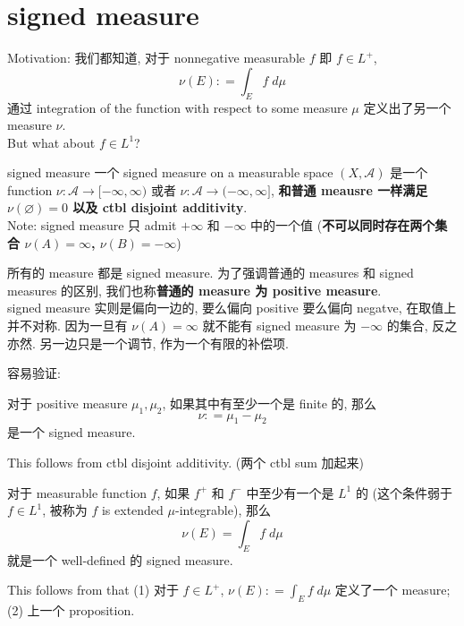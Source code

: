 \documentclass[lang=cn,11pt]{elegantbook}
\begin{document}
\section{signed measure}
Motivation: 我们都知道, 对于 nonnegative measurable $f$ 即 $f \in L^+$, \[
\nu(E) : = \int_E f \; d \mu
\]
通过 integration of the function with respect to some measure $\mu$ 定义出了另一个 measure $\nu$.\\
But what about $f \in L^1$?
\begin{definition}{signed measure}
    一个 signed measure on a measurable space $(X,\mathcal{A})$ 是一个 function $\nu : \mathcal{A}\to [-\infty, \infty)$ 或者 $\nu: \mathcal{A}\to (-\infty, \infty]$, \textbf{和普通 meausre 一样满足 $\nu (\varnothing) = 0$ 以及 ctbl disjoint additivity}.\\
    Note: signed measure 只 admit $+\infty$ 和 $-\infty$ 中的一个值 (\textbf{不可以同时存在两个集合 $\nu(A) = \infty$, $\nu(B) = -\infty$})
\end{definition}
\begin{remark}
    所有的 measure 都是 signed measure. 为了强调普通的 measures 和 signed measures 的区别, 我们也称\textbf{普通的 measure 为 positive measure}.\\
    signed measure 实则是偏向一边的, 要么偏向 positive 要么偏向 negatve, 在取值上并不对称. 因为一旦有 $\nu(A) = \infty$ 就不能有 signed measure 为 $-\infty$ 的集合, 反之亦然. 另一边只是一个调节, 作为一个有限的补偿项.
\end{remark}

\begin{example}
    容易验证: 
    \begin{proposition}
        对于 positive measure $\mu_1, \mu_2$, 如果其中有至少一个是 finite 的, 那么 \[
    \nu :  = \mu_1 - \mu_2
    \] 是一个 signed measure.
    \end{proposition}
     This follows from ctbl disjoint additivity. (两个 ctbl sum 加起来)
\end{example}

\begin{example}
\begin{proposition}
    对于 measurable function $f$, 如果 $f^+$ 和 $f^-$ 中至少有一个是 $L^1$ 的 (这个条件弱于 $f\in L^1$, 被称为 $f$ is extended $\mu$-integrable), 那么 \[
    \nu (E) = \int_E f \; d\mu
    \]就是一个 well-defined 的 signed measure.
\end{proposition}
This follows from that (1) 对于 $f\in L^+$, $\nu(E) : = \int_E f \; d \mu$ 定义了一个 measure; (2) 上一个 proposition.
\end{example}
\end{document}
